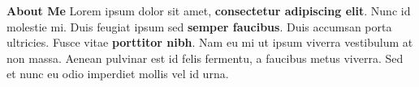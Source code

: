 \documentclass[letterpaper,12pt]{werner} %
\begin{document}



\vspace{3pt}


\begin{justify}
{{\color{accent}
\fontsize{12pt}{12pt}\selectfont\bfseries\uppercase About Me }}
Lorem ipsum dolor sit amet, \textbf{consectetur adipiscing elit}. Nunc id molestie mi. Duis feugiat ipsum sed \textbf{semper faucibus}. Duis accumsan porta ultricies. Fusce vitae \textbf{porttitor nibh}. Nam eu mi ut ipsum viverra vestibulum at non massa. Aenean pulvinar est id felis fermentu, a faucibus metus viverra. Sed et nunc eu odio imperdiet mollis vel id urna.
\end{justify}
\vspace{-4pt}

\end{document}
